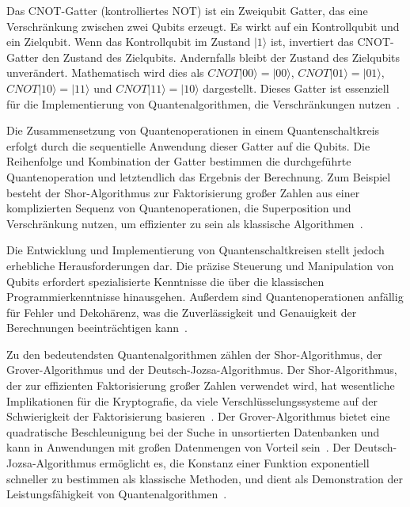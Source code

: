 Das CNOT-Gatter (kontrolliertes NOT) ist ein Zweiqubit Gatter, das eine Verschränkung 
zwischen zwei Qubits erzeugt. Es wirkt auf ein Kontrollqubit und ein Zielqubit. Wenn das Kontrollqubit 
im Zustand \(|1\rangle\) ist, invertiert das CNOT-Gatter den Zustand des Zielqubits. Andernfalls bleibt 
der Zustand des Zielqubits unverändert. 
Mathematisch wird dies als \( CNOT|00\rangle = |00\rangle \), \( CNOT|01\rangle = |01\rangle \), \( CNOT|10\rangle = |11\rangle \) 
und \( CNOT|11\rangle = |10\rangle \) dargestellt. Dieses Gatter ist essenziell für die Implementierung von 
Quantenalgorithmen, die Verschränkungen nutzen~\cite{feynman2018simulating}.

Die Zusammensetzung von Quantenoperationen in einem Quantenschaltkreis erfolgt durch die sequentielle Anwendung 
dieser Gatter auf die Qubits. Die Reihenfolge und Kombination der Gatter bestimmen die durchgeführte 
Quantenoperation und letztendlich das Ergebnis der Berechnung. 
Zum Beispiel besteht der Shor-Algorithmus zur Faktorisierung großer Zahlen aus einer komplizierten Sequenz von 
Quantenoperationen, die Superposition und Verschränkung nutzen, um effizienter zu sein als klassische Algorithmen~\cite{shor1999polynomial}.

Die Entwicklung und Implementierung von Quantenschaltkreisen stellt jedoch erhebliche Herausforderungen 
dar. Die präzise Steuerung und Manipulation von Qubits erfordert spezialisierte Kenntnisse 
die über die klassischen Programmierkenntnisse hinausgehen. Außerdem sind 
Quantenoperationen anfällig für Fehler und Dekohärenz, was die Zuverlässigkeit und Genauigkeit der 
Berechnungen beeinträchtigen kann~\cite{preskill2018quantum}.

Zu den bedeutendsten Quantenalgorithmen zählen der Shor-Algorithmus, der Grover-Algorithmus und der 
Deutsch-Jozsa-Algorithmus. Der Shor-Algorithmus, der zur effizienten Faktorisierung großer Zahlen 
verwendet wird, hat wesentliche Implikationen für die Kryptografie, da viele Verschlüsselungssysteme 
auf der Schwierigkeit der Faktorisierung basieren~\cite{shor1999polynomial}. Der Grover-Algorithmus bietet eine 
quadratische Beschleunigung bei der Suche in unsortierten Datenbanken und kann in Anwendungen mit 
großen Datenmengen von Vorteil sein~\cite{grover1996fast}. Der Deutsch-Jozsa-Algorithmus ermöglicht es, die 
Konstanz einer Funktion exponentiell schneller zu bestimmen als klassische Methoden, und dient als 
Demonstration der Leistungsfähigkeit von Quantenalgorithmen~\cite{deutsch1992rapid}.

